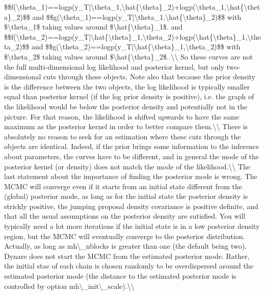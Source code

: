 \documentclass[10pt,math=newtx,citestyle=gb7714-2015,bibstyle=gb7714-2015]{elegantbook}
\begin{document}
	\$\$f(\textbackslash{}theta\_1)==logp(y\_T|\textbackslash{}theta\_1,\textbackslash{}hat\{\textbackslash{}theta\}\_2)+logp(\textbackslash{}theta\_1,\textbackslash{}hat\{\textbackslash{}theta\}\_2)\$\$
	and
	\$\$g(\textbackslash{}theta\_1)==logp(y\_T|\textbackslash{}theta\_1,\textbackslash{}hat\{\textbackslash{}theta\}\_2)\$\$
	with \$\textbackslash{}theta\_1\$ taking values around \$\textbackslash{}hat\{\textbackslash{}theta\}\_1\$. and
	\$\$f(\textbackslash{}theta\_2)==logp(y\_T|\textbackslash{}hat\{\textbackslash{}theta\}\_1,\textbackslash{}theta\_2)+logp(\textbackslash{}hat\{\textbackslash{}theta\}\_1,\textbackslash{}theta\_2)\$\$
	and
	\$\$g(\textbackslash{}theta\_2)==logp(y\_T|\textbackslash{}hat\{\textbackslash{}theta\}\_1,\textbackslash{}theta\_2)\$\$
	with \$\textbackslash{}theta\_2\$ taking values around \$\textbackslash{}hat\{\textbackslash{}theta\}\_2\$. \textbackslash{}\textbackslash{}
	So these curves are not the full multi-dimensional log likelihood and posterior kernel, but only two-dimensional cuts through these objects. Note also that because the prior density is the difference between the two objects, the log likelihood is typically smaller equal than posterior kernel (if the log prior density is positive), i.e. the graph of the likelihood would be below the posterior density and potentially not in the picture. For that reason, the likelihood is shifted upwards to have the same maximum as the posterior kernel in order to better compare them.\textbackslash{}\textbackslash{}
	There is absolutely no reason to seek for an estimation where these cuts through the objects are identical. Indeed, if the prior brings some information to the inference about parameters, the curves have to be different, and in general the mode of the posterior kernel (or density) does not match the mode of the likelihood.\textbackslash{}\textbackslash{}
	The last statement about the importance of finding the posterior mode is wrong. The MCMC will converge even if it starts from an initial state different from the (global) posterior mode, as long as for the initial state the posterior density is strickly positive, the jumping proposal density covariance is positive definite, and that all the usual assumptions on the posterior density are sutisfied. You will typically need a lot more iterations if the initial state is in a low posterior density region, but the MCMC will eventually converge to the posterior distribution. Actually, as long as mh\textbackslash{}\_nblocks is greater than one (the default being two). Dynare does not start the MCMC from the estimated posterior mode. Rather, the initial stae of each chain is chosen randomly to be overdispersed around the estimated posterior mode (the distance to the estimated posterior mode is controlled by option mh\textbackslash{}\_init\textbackslash{}\_scale).\textbackslash{}\textbackslash{}
\end{document}
